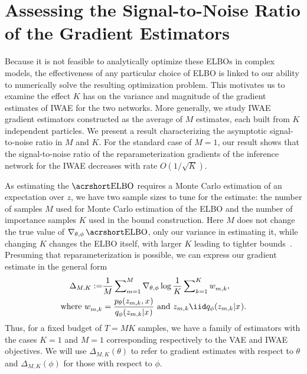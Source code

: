 
\section{Assessing the Signal-to-Noise Ratio of the Gradient Estimators}
\label{sec:snr}
Because it is not feasible to analytically optimize these \glspl{ELBO} in complex models,  the effectiveness of any particular choice of \gls{ELBO} is linked
to our ability to numerically solve the resulting optimization problem. This motivates us to examine 
the effect $K$ has on the variance and magnitude of the gradient estimates of \gls{IWAE} for the two networks. More generally, we study \gls{IWAE} gradient estimators constructed as the average of $M$ estimates, each built from $K$ independent particles. We present a result characterizing the asymptotic signal-to-noise ratio in $M$ and $K$. For the standard case of $M=1$, our result shows that the signal-to-noise ratio of the reparameterization gradients of the inference network for the \gls{IWAE} decreases with rate $O(1/\sqrt{K})$.

As estimating the $\ELBO$ requires a Monte Carlo estimation of an expectation over $z$, 
we have two sample sizes to tune for the estimate:
the number of samples $M$ used for Monte Carlo estimation of the \gls{ELBO} and the number of importance samples $K$ used
in the bound construction.  Here $M$ does not change the true value of
$\nabla_{\theta, \phi} \ELBO$, only our variance in estimating
it, while changing $K$ changes the \gls{ELBO} itself, with larger $K$ leading to tighter 
bounds~\citep{burda2016importance}.  Presuming that reparameterization
is possible, we can express our gradient estimate in the general form
\begin{align}
\label{eq:grad-est}
\Delta_{M,K} :=  &\frac{1}{M} \sum\nolimits_{m=1}^{M}
\nabla_{\theta, \phi} \log \frac{1}{K} \sum\nolimits_{k=1}^{K} w_{m,k}^{}, \\
\text{where} \, \, w_{m,k}^{} &= \frac{p_{\theta}(z_{m,k},x^{})}{q_{\phi}(z_{m,k} \given x^{})} \, \,
\text{and} \, \,z_{m,k} \iid q_{\phi}(z_{m,k} \given x^{}). \nonumber
\end{align}
Thus, for a fixed budget of $T = MK$ samples, we have a family of estimators with the cases $K=1$ and $M=1$
corresponding respectively to the \gls{VAE} and \gls{IWAE} objectives.
We will use ${\Delta}_{M,K} \left(\theta\right)$ to refer to gradient estimates with respect
to $\theta$ and ${\Delta}_{M,K} \left(\phi\right)$ for those with respect to
$\phi$. 

